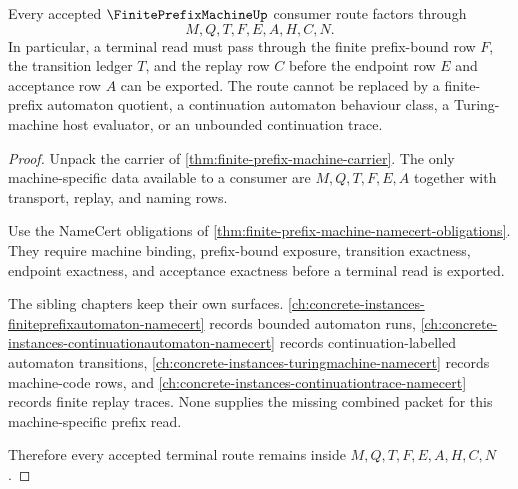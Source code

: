 \begin{theorem}
\label{thm:finite-prefix-machine-nonescape}
Every accepted $\FinitePrefixMachineUp$ consumer route factors through
$$
M,Q,T,F,E,A,H,C,N.
$$
In particular, a terminal read must pass through the finite prefix-bound row $F$, the transition ledger $T$, and the replay row $C$ before the endpoint row $E$ and acceptance row $A$ can be exported. The route cannot be replaced by a finite-prefix automaton quotient, a continuation automaton behaviour class, a Turing-machine host evaluator, or an unbounded continuation trace.
\end{theorem}
\begin{proof}
Unpack the carrier of \autoref{thm:finite-prefix-machine-carrier}. The only machine-specific data available to a consumer are $M,Q,T,F,E,A$ together with transport, replay, and naming rows.

Use the NameCert obligations of \autoref{thm:finite-prefix-machine-namecert-obligations}. They require machine binding, prefix-bound exposure, transition exactness, endpoint exactness, and acceptance exactness before a terminal read is exported.

The sibling chapters keep their own surfaces. \autoref{ch:concrete-instances-finiteprefixautomaton-namecert} records bounded automaton runs, \autoref{ch:concrete-instances-continuationautomaton-namecert} records continuation-labelled automaton transitions, \autoref{ch:concrete-instances-turingmachine-namecert} records machine-code rows, and \autoref{ch:concrete-instances-continuationtrace-namecert} records finite replay traces. None supplies the missing combined packet for this machine-specific prefix read.

Therefore every accepted terminal route remains inside $M,Q,T,F,E,A,H,C,N$.
\end{proof}

